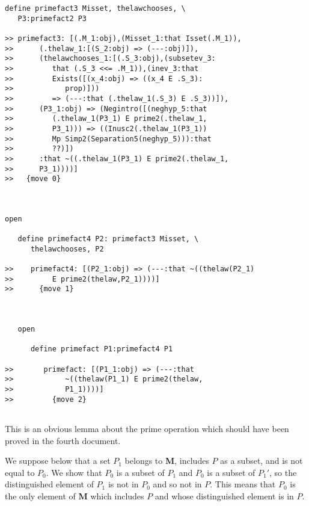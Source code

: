 \documentclass[12pt]{article}
\begin{document}
\begin{verbatim}
define primefact3 Misset, thelawchooses, \
   P3:primefact2 P3

>> primefact3: [(.M_1:obj),(Misset_1:that Isset(.M_1)),
>>      (.thelaw_1:[(S_2:obj) => (---:obj)]),
>>      (thelawchooses_1:[(.S_3:obj),(subsetev_3:
>>         that (.S_3 <<= .M_1)),(inev_3:that
>>         Exists([(x_4:obj) => ((x_4 E .S_3):
>>            prop)]))
>>         => (---:that (.thelaw_1(.S_3) E .S_3))]),
>>      (P3_1:obj) => (Negintro([(neghyp_5:that
>>         (.thelaw_1(P3_1) E prime2(.thelaw_1,
>>         P3_1))) => ((Inusc2(.thelaw_1(P3_1))
>>         Mp Simp2(Separation5(neghyp_5))):that
>>         ??)])
>>      :that ~((.thelaw_1(P3_1) E prime2(.thelaw_1,
>>      P3_1))))]
>>   {move 0}



open

   define primefact4 P2: primefact3 Misset, \
      thelawchooses, P2

>>    primefact4: [(P2_1:obj) => (---:that ~((thelaw(P2_1)
>>         E prime2(thelaw,P2_1))))]
>>      {move 1}



   open

      define primefact P1:primefact4 P1

>>       primefact: [(P1_1:obj) => (---:that
>>            ~((thelaw(P1_1) E prime2(thelaw,
>>            P1_1))))]
>>         {move 2}


\end{verbatim}

This is an obvious lemma about the prime operation which should have been proved in the fourth document.  

We suppose below that a set $P_1$ belongs to {\bf M}, includes $P$ as a subset, and is not equal to $P_0$.  We show that $P_0$ is a subset of $P_1$
and $P_0$ is a subset of $P_1'$, so the distinguished element of $P_1$ is not in $P_0$ and so not in $P$.  This means that $P_0$ is the only element of {\bf M} which includes $P$ and whose distinguished element is in $P$.
\end{document}
